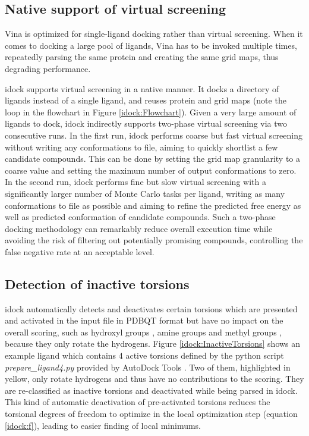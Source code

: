 \subsection{Native support of virtual screening}

Vina is optimized for single-ligand docking rather than virtual screening. When it comes to docking a large pool of ligands, Vina has to be invoked multiple times, repeatedly parsing the same protein and creating the same grid maps, thus degrading performance.

idock supports virtual screening in a native manner. It docks a directory of ligands instead of a single ligand, and reuses protein and grid maps (note the loop in the flowchart in Figure \ref{idock:Flowchart}). Given a very large amount of ligands to dock, idock indirectly supports two-phase virtual screening via two consecutive runs. In the first run, idock performs coarse but fast virtual screening without writing any conformations to file, aiming to quickly shortlist a few candidate compounds. This can be done by setting the grid map granularity to a coarse value and setting the maximum number of output conformations to zero. In the second run, idock performs fine but slow virtual screening with a significantly larger number of Monte Carlo tasks per ligand, writing as many conformations to file as possible and aiming to refine the predicted free energy as well as predicted conformation of candidate compounds. Such a two-phase docking methodology can remarkably reduce overall execution time while avoiding the risk of filtering out potentially promising compounds, controlling the false negative rate at an acceptable level.

\subsection{Detection of inactive torsions}

idock automatically detects and deactivates certain torsions which are presented and activated in the input file in PDBQT format but have no impact on the overall scoring, such as hydroxyl groups , amine groups  and methyl groups , because they only rotate the hydrogens. Figure \ref{idock:InactiveTorsions} shows an example ligand which contains 4 active torsions defined by the python script \textit{prepare\_ligand4.py} provided by AutoDock Tools \citep{596}. Two of them, highlighted in yellow, only rotate hydrogens and thus have no contributions to the scoring. They are re-classified as inactive torsions and deactivated while being parsed in idock. This kind of automatic deactivation of pre-activated torsions reduces the torsional degrees of freedom to optimize in the local optimization step (equation \eqref{idock:f}), leading to easier finding of local minimums.

